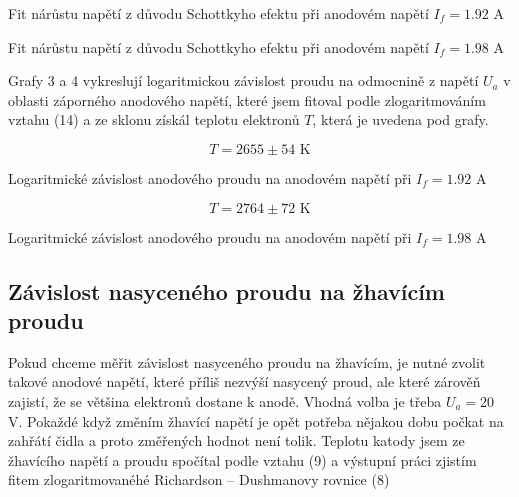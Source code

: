\documentclass[a4paper,11pt]{article}
\begin{document}
\begin{table}[h]
    \captionsetup{type=graph}
    \begin{minipage}{.45\linewidth}
        \centering
        
        \caption{Fit nárůstu napětí z důvodu Schottkyho efektu při anodovém napětí $ I_f = 1.92 $ A }
    \end{minipage}
    \hfill
    \begin{minipage}{.45\linewidth}
        \centering
        
        \caption{Fit nárůstu napětí z důvodu Schottkyho efektu při anodovém napětí $ I_f = 1.98 $ A }
    \end{minipage}
\end{table}

\newpage

Grafy 3 a 4 vykreslují logaritmickou závislost proudu na odmocnině z napětí $ U_a $ v oblasti záporného anodového napětí, které jsem fitoval podle zlogaritmováním vztahu (14) a ze sklonu získál teplotu elektronů $ T $, která je uvedena pod grafy. 

\begin{table}[h]
    \captionsetup{type=graph}
    \begin{minipage}{.45\linewidth}
        \centering
        
        \[ T = 2655 \pm 54 \text{ K} \]
        \caption{ Logaritmické závislost anodového proudu na anodovém napětí při $ I_f = 1.92 $ A }
    \end{minipage}
    \hfill
    \begin{minipage}{.45\linewidth}
        \centering
        
        \[ T = 2764 \pm 72 \text{ K} \]

        \caption{Logaritmické závislost anodového proudu na anodovém napětí při $ I_f = 1.98 $ A }
    \end{minipage}
\end{table}

\subsection{Závislost nasyceného proudu na žhavícím proudu}

Pokud chceme měřit závislost nasyceného proudu na žhavícím, je nutné zvolit takové anodové napětí, které příliš nezvýší nasycený proud, ale které zárověň zajistí, že se většina elektronů dostane k anodě. Vhodná volba je třeba $ U_a = 20 $ V. Pokaždé když změním žhavící napětí je opět potřeba nějakou dobu počkat na zahřátí čidla a proto změřených hodnot není tolik. Teplotu katody jsem ze žhavícího napětí a proudu spočítal podle vztahu (9) a výstupní práci zjistím fitem zlogaritmovanéhé Richardson – Dushmanovy rovnice (8)
\end{document}
